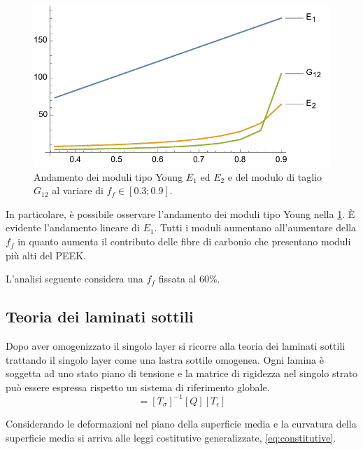\documentclass[a4paper,num-refs]{oup-contemporary}
\begin{document}
\begin{figure}
	\includegraphics[width=\linewidth]{miture_rule_result}
	\caption{Andamento dei moduli tipo Young $E_1$ ed $E_2$ e del modulo di taglio $G_{12}$ al variare di $f_f\in \left[0.3;0.9\right]$.}
		\label{fig:mixtureRule} 
\end{figure}

In particolare, è possibile osservare l'andamento dei moduli tipo Young nella \cref{fig:mixtureRule}. È evidente l'andamento lineare di $E_1$. Tutti i moduli aumentano all'aumentare della $f_f$ in quanto aumenta il contributo delle fibre di carbonio che presentano moduli più alti del PEEK. 

L'analisi seguente considera una $f_f$ fissata al 60\%. 




\subsection{Teoria dei laminati sottili }

Dopo aver omogenizzato il singolo layer si ricorre alla teoria dei laminati sottili \citep{SOTTILI} trattando il singolo layer come una lastra sottile omogenea. Ogni lamina è soggetta ad uno stato piano di tensione e la matrice di rigidezza nel singolo strato può essere espressa rispetto un sistema di riferimento globale. 
\begin{equation}
[\bar{Q}]=\left[T_{\sigma}\right]^{-1}[Q]\left[T_{\epsilon}\right]
\end{equation}

Considerando le deformazioni nel piano della superficie media e la curvatura della superficie media si arriva alle leggi costitutive generalizzate, \cref{eq:constitutive}.
\end{document}
